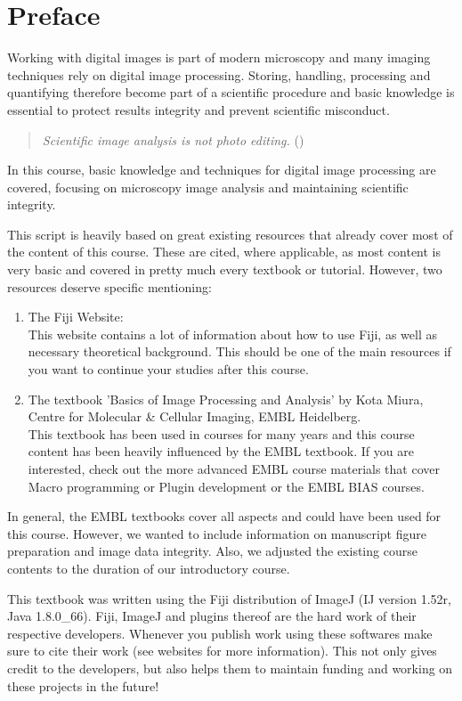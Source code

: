 \chapter*{Preface}

Working with digital images is part of modern microscopy and many imaging techniques rely on digital image processing. Storing, handling, processing and quantifying therefore become part of a scientific procedure and basic knowledge is essential to protect results integrity and prevent scientific misconduct. 

\begin{quote}
	\emph{Scientific image analysis is not photo editing.} (\cite{rossner2004})
\end{quote}

In this course, basic knowledge and techniques for digital image processing are covered, focusing on microscopy image analysis and maintaining scientific integrity. 


This script is heavily based on great existing resources that already cover most of the content of this course. These are cited, where applicable, as most content is very basic and covered in pretty much every textbook or tutorial. However, two resources deserve specific mentioning:
\begin{enumerate}
	\item The Fiji Website:\\This website contains a lot of information about how to use Fiji, as well as necessary theoretical background. This should be one of the main resources if you want to continue your studies after this course.
	\item The textbook 'Basics of Image Processing and Analysis' by Kota Miura, Centre for Molecular \& Cellular Imaging, EMBL Heidelberg.\\This textbook has been used in courses for many years and this course content has been heavily influenced by the EMBL textbook. If you are interested, check out the more advanced EMBL course materials that cover Macro programming or Plugin development or the EMBL BIAS courses.
\end{enumerate}

In general, the EMBL textbooks cover all aspects and could have been used for this course. However, we wanted to include information on manuscript figure preparation and image data integrity. Also, we adjusted the existing course contents to the duration of our introductory course.

This textbook was written using the Fiji\cite{schindelin_fiji:_2012} distribution of ImageJ (IJ version 1.52r, Java 1.8.0\_66)\cite{schneider_nih_2012,rueden_imagej2:_2017}. Fiji, ImageJ and plugins thereof are the hard work of their respective developers. Whenever you publish work using these softwares make sure to cite their work (see websites for more information). This not only gives credit to the developers, but also helps them to maintain funding and working on these projects in the future!

